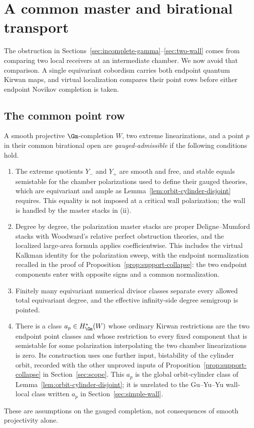 \section{A common master and birational transport}
\label{sec:global-transport}

The obstruction in Sections~\ref{sec:incomplete-gamma}--\ref{sec:two-wall}
comes from comparing two local receivers at an intermediate chamber.  We now
avoid that comparison.  A single equivariant cobordism carries both endpoint
quantum Kirwan maps, and virtual localization compares their point rows before
either endpoint Novikov completion is taken.

\subsection{The common point row}

\begin{definition}
\label{def:gauged-admissible}
A smooth projective \(\Gm\)-completion \(W\), two extreme linearizations,
and a point \(p\) in their common birational open are
\emph{gauged-admissible} if the following conditions hold.
\begin{enumerate}[label=\textup{(\roman*)}]
\item The extreme quotients \(Y_-\) and \(Y_+\) are smooth and free, and
stable equals semistable for the chamber polarizations used to define their
gauged theories, which are equivariant and ample as
Lemma~\ref{lem:orbit-cylinder-disjoint} requires.  This equality is not imposed at a critical wall
polarization; the wall is handled by the master stacks in \textup{(ii)}.
\item Degree by degree, the polarization master stacks are proper
Deligne--Mumford stacks with Woodward's relative perfect obstruction theories,
and the localized large-area formula applies coefficientwise.  This includes
the virtual Kalkman identity for the polarization sweep, with the endpoint
normalization recalled in the proof of
Proposition~\ref{prop:support-collapse}: the two endpoint components enter with
opposite signs and a common normalization.
\item Finitely many equivariant numerical divisor classes separate every
allowed total equivariant degree, and the effective infinity-side degree
semigroup is pointed.
\item There is a class \(a_p\in H^*_{\Gm}(W)\) whose ordinary Kirwan
restrictions are the two endpoint point classes and whose restriction to
every fixed component that is semistable for some polarization interpolating
the two chamber linearizations is zero.  Its construction uses one further
input, bistability of the cylinder orbit, recorded with the other unproved
inputs of Proposition~\ref{prop:support-collapse} in Section~\ref{sec:scope}.  This \(a_p\) is the global
orbit-cylinder class of Lemma~\ref{lem:orbit-cylinder-disjoint}; it is
unrelated to the Gu--Yu--Yu wall-local class written \(a_p\) in
Section~\ref{sec:simple-wall}.
\end{enumerate}
These are assumptions on the gauged completion, not consequences of smooth
projectivity alone.
\end{definition}

